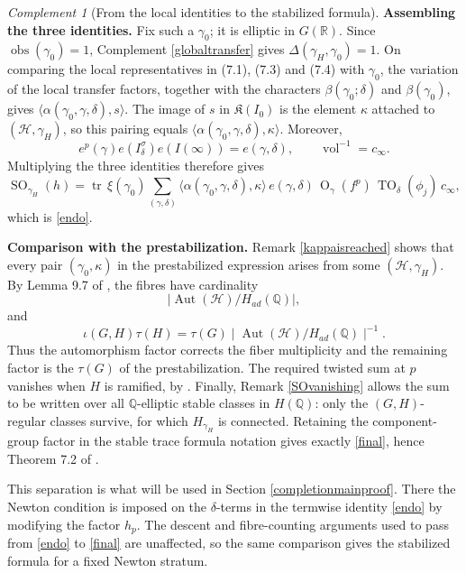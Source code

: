 \documentclass[11pt,a4paper]{article}
\DeclareMathOperator{\obs}{obs}
\theoremstyle{definition}
\theoremstyle{plain}
\theoremstyle{remark}
\newtheorem{Rc}[shared]{Complement}
\theoremstyle{plain}
\DeclareMathOperator{\vol}{vol}
\DeclareMathOperator{\Aut}{Aut}
\DeclareMathOperator{\tr}{tr}
\DeclareMathOperator{\Or}{O}
\DeclareMathOperator{\TO}{TO}
\DeclareMathOperator{\SO}{SO}
\begin{document}
\begin{Rc}[From the local identities to the stabilized formula]
    \textbf{Assembling the three identities.} Fix such a $\gamma_0$; it is elliptic in $G(\mathbb{R})$. Since $\obs(\gamma_0)=1$, Complement \ref{globaltransfer} gives $\Delta(\gamma_H,\gamma_0)=1$. On comparing the local representatives in (7.1), (7.3) and (7.4) with $\gamma_0$, the variation of the local transfer factors, together with the characters $\beta(\gamma_0;\delta)$ and $\beta(\gamma_0)$, gives $\langle \alpha(\gamma_0,\gamma,\delta),s\rangle$. The image of $s$ in $\mathfrak{K}(I_0)$ is the element $\kappa$ attached to $(\mathcal H,\gamma_H)$, so this pairing equals $\langle \alpha(\gamma_0,\gamma,\delta),\kappa\rangle$. Moreover,
    $$e^p(\gamma)e(I_\delta^{\sigma})e(I(\infty))=e(\gamma,\delta), \qquad \vol^{-1}=c_\infty.$$
    Multiplying the three identities therefore gives
    $$\SO_{\gamma_H}(h) = \tr\,\xi(\gamma_0) \sum_{(\gamma, \delta)} \langle \alpha(\gamma_0, \gamma, \delta), \kappa \rangle \, e(\gamma,\delta) \, \Or_{\gamma}(f^p) \, \TO_{\delta}(\phi_j) \, c_{\infty},$$
    which is \eqref{endo}.

    \textbf{Comparison with the prestabilization.} Remark \ref{kappaisreached} shows that every pair $(\gamma_0,\kappa)$ in the prestabilized expression arises from some $(\mathcal H,\gamma_H)$. By Lemma 9.7 of \cite{MR858284}, the fibres have cardinality
    $$\mid\Aut(\mathcal H)/H_{ad}(\mathbb{Q})\mid,$$
    and
    $$\iota(G,H)\tau(H)=\tau(G)\mid\Aut(\mathcal H)/H_{ad}(\mathbb{Q})\mid^{-1}.$$
    Thus the automorphism factor corrects the fiber multiplicity and the remaining factor is the $\tau(G)$ of the prestabilization. The required twisted sum at $p$ vanishes when $H$ is ramified, by \cite[Proposition 7.4.16]{kisin2021stabletraceformulashimura}. Finally, Remark \ref{SOvanishing} allows the sum to be written over all $\mathbb{Q}$-elliptic stable classes in $H(\mathbb{Q})$: only the $(G,H)$-regular classes survive, for which $H_{\gamma_H}$ is connected. Retaining the component-group factor in the stable trace formula notation gives exactly \eqref{final}, hence Theorem 7.2 of \cite{MR1044820}.

    This separation is what will be used in Section \ref{completionmainproof}. There the Newton condition is imposed on the $\delta$-terms in the termwise identity \eqref{endo} by modifying the factor $h_p$. The descent and fibre-counting arguments used to pass from \eqref{endo} to \eqref{final} are unaffected, so the same comparison gives the stabilized formula for a fixed Newton stratum.
\end{Rc}
\end{document}
